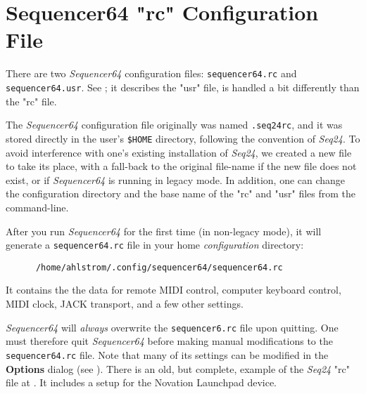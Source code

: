 %
%
%

\section{Sequencer64 "rc" Configuration File}
\label{sec:seq64_rc_file}

   There are two \textsl{Sequencer64} configuration files:
   \texttt{sequencer64.rc} and \texttt{sequencer64.usr}.
   See ; it describes the "usr" file,
   is handled a bit differently than the "rc" file.

   The \textsl{Sequencer64} configuration file originally was
   named \texttt{.seq24rc},
   and it was stored directly in the user's \texttt{\$HOME} directory,
   following the convention of \textsl{Seq24}.
   To avoid interference with one's existing installation of 
   \textsl{Seq24}, we created a new file
   to take its place, with a fall-back to the original file-name if the new
   file does not exist, or if \textsl{Sequencer64} is running in
   legacy mode.
   In addition, one can change the configuration directory and the base name of
   the "rc" and "usr" files from the command-line.

   After you run \textsl{Sequencer64} for the first time (in non-legacy
   mode), it will generate a \texttt{sequencer64.rc} file in your home
   \textsl{configuration} directory:

   \begin{verbatim}
      /home/ahlstrom/.config/sequencer64/sequencer64.rc
   \end{verbatim}

   It contains the the data for remote MIDI control, computer keyboard
   control, MIDI clock, JACK transport, and a few other settings.

   \textsl{Sequencer64} will
   \textsl{always} overwrite the \texttt{sequencer6.rc} file upon
   quitting.  One must therefore quit \textsl{Sequencer64} before making
   manual modifications to the \texttt{sequencer64.rc} file.
   Note that many of
   its settings can be modified in the \textbf{Options} dialog
   (see ).
   There is an old, but complete, example of the \textsl{Seq24}
   "rc" file at \cite{seq24launchpadmapper}.
   It includes a setup for the
   Novation Launchpad device.

